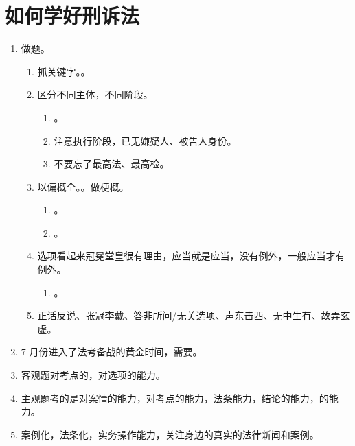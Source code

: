 \section{如何学好刑诉法}
\begin{enumerate}
  \item 做题。
        \begin{enumerate}
          \item 抓关键字。。
          \item 区分不同主体，不同阶段。
                \begin{enumerate}
                  \item {}。
                  \item 注意执行阶段，已无嫌疑人、被告人身份。
                  \item 不要忘了最高法、最高检。
                \end{enumerate}
          \item 以偏概全。。做梗概。
                \begin{enumerate}
                  \item {}。
                  \item {}。
                \end{enumerate}
          \item 选项看起来冠冕堂皇很有理由，应当就是应当，没有例外，一般应当才有例外。
                \begin{enumerate}
                  \item {}。
                \end{enumerate}
          \item 正话反说、张冠李戴、答非所问/无关选项、声东击西、无中生有、故弄玄虚。
        \end{enumerate}
  \item 7 月份进入了法考备战的黄金时间，需要。
  \item 客观题对考点的，对选项的能力。
  \item 主观题考的是对案情的能力，对考点的能力，法条能力，结论的能力，的能力。
  \item 案例化，法条化，实务操作能力，关注身边的真实的法律新闻和案例。

\end{enumerate}

